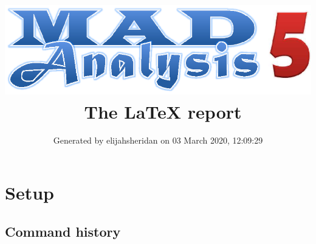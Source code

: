 \documentclass[a4paper, 10pt]{article}
\title{{\includegraphics[scale=.4]{logo.eps}}\ The LaTeX report}
\author{Generated by elijahsheridan on 03 March 2020, 12:09:29}
\begin{document}
\maketitle
\flushbottom

\newpage
\section{ Setup}

\subsection{ Command history}
\end{document}
